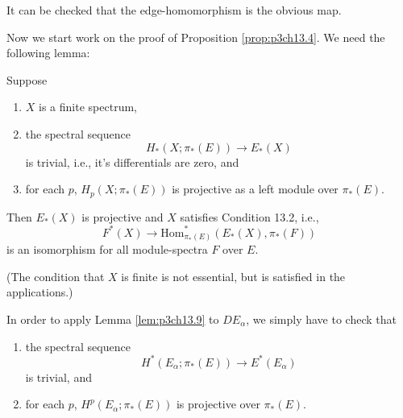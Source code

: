 \documentclass[../main]{subfiles}
\begin{document}
It can be checked that the edge-homomorphism is the obvious map.

Now we start work on the proof of Proposition \ref{prop:p3ch13.4}. We need the following lemma:
\begin{lemma}\label{lem:p3ch13.9}
Suppose \begin{enumerate}[label=(\roman*)]
    \item $X$ is a finite spectrum,
    \item the spectral sequence
    \[H_\ast(X;\pi_\ast(E)) \longrightarrow E_\ast(X)\]
    is trivial, i.e., it's differentials are zero, and
    \item for each $p$, $H_p(X;\pi_\ast(E))$ is projective as a left module over $\pi_\ast(E)$.
\end{enumerate} 


Then $E_\ast(X)$ is projective and $X$ satisfies Condition 13.2, i.e., 
\[F^\ast(X) \longrightarrow \text{Hom}^\ast_{\pi_\ast(E)}(E_\ast(X), \pi_\ast(F))\]
is an isomorphism for all module-spectra $F$ over $E$.

(The condition that $X$ is finite is not essential, but is satisfied in the applications.)

In order to apply Lemma \ref{lem:p3ch13.9} to $DE_\alpha$, we simply have to check that
\begin{enumerate}[label=(\roman*)]
    \item the spectral sequence
\[H^\ast(E_\alpha;\pi_\ast(E)) \longrightarrow E^\ast(E_\alpha)\]
is trivial, and
    \item for each $p$, $H^p(E_\alpha;\pi_\ast(E))$ is projective over $\pi_\ast(E)$.
\end{enumerate}
\end{lemma}
\end{document}
